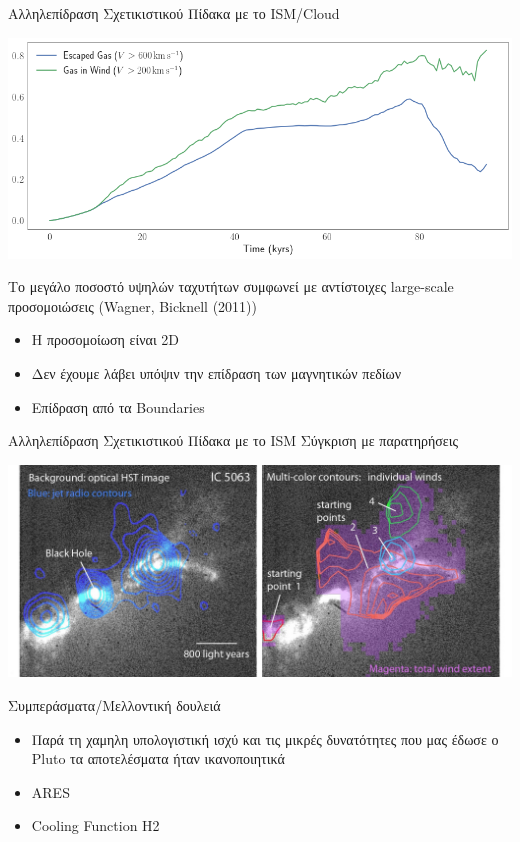 \documentclass{beamer}
\begin{document}
\begin{frame}{Αλληλεπίδραση Σχετικιστικού Πίδακα με το ISM/Cloud}
	
\begin{center}
	\includegraphics[width=1\linewidth]{../Document/DataImages/RatioEscapedGas}
\end{center}
Το μεγάλο ποσοστό υψηλών ταχυτήτων συμφωνεί με αντίστοιχες large-scale προσομοιώσεις (Wagner, Bicknell (2011))
\begin{itemize}
	\item{Η προσομοίωση είναι 2D}
	\item{Δεν έχουμε λάβει υπόψιν την επίδραση των μαγνητικών πεδίων}
	\item{Επίδραση από τα Boundaries}
\end{itemize}
\end{frame}

\begin{frame}{Αλληλεπίδραση Σχετικιστικού Πίδακα με το ISM }{Σύγκριση με παρατηρήσεις}
	
\begin{center}
	\includegraphics[width=1\linewidth]{Images/thejetofabla}
\end{center}
\end{frame}

\begin{frame}{Συμπεράσματα/Μελλοντική δουλειά}
	\begin{itemize}
		\item{Παρά τη χαμηλη υπολογιστική ισχύ και τις μικρές δυνατότητες που μας έδωσε ο Pluto τα αποτελέσματα ήταν ικανοποιητικά}
		\item{ARES}
		\item{Cooling Function H2}
	\end{itemize}
\end{frame}
	
\end{document}
